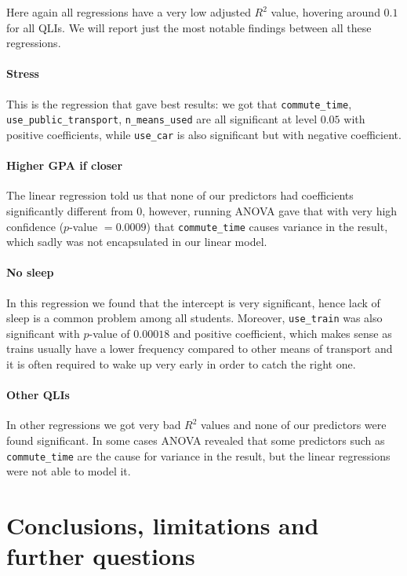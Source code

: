 \documentclass[11pt]{extarticle}
\numberwithin{table}{section}
\numberwithin{figure}{section}
\numberwithin{equation}{section}
\begin{document}
Here again all regressions have a very low adjusted $R^2$ value, hovering around $0.1$ for all QLIs.
We will report just the most notable findings between all these regressions.

\paragraph{Stress}
This is the regression that gave best results:
we got that
\texttt{commute\_time},
\texttt{use\_public\_transport},
\texttt{n\_means\_used}
are all significant at level $0.05$ with positive coefficients,
while \texttt{use\_car} is also significant but with negative coefficient.

\paragraph{Higher GPA if closer}
The linear regression told us that none of our predictors had coefficients
significantly different from $0$, however, running ANOVA gave that with
very high confidence ($p$-value $= 0.0009$) that \texttt{commute\_time}
causes variance in the result, which sadly was not encapsulated in our linear model.

\paragraph{No sleep}
In this regression we found that the intercept is very significant,
hence lack of sleep is a common problem among all students.
Moreover, \texttt{use\_train} was also significant with $p$-value of $0.00018$
and positive coefficient, which makes sense as trains usually have a
lower frequency compared to other means of transport and it is often required
to wake up very early in order to catch the right one.

\paragraph{Other QLIs}
In other regressions we got very bad $R^2$ values and none of our predictors
were found significant.
In some cases ANOVA revealed that some predictors such as \texttt{commute\_time}
are the cause for variance in the result, but the linear regressions were not able
to model it.

\section{Conclusions, limitations and further questions}
\end{document}

